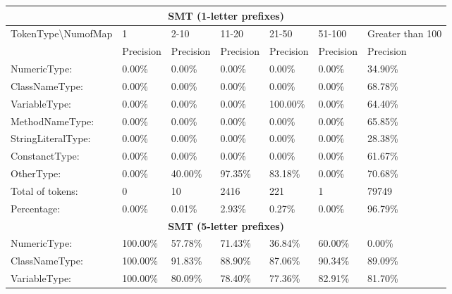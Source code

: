 \begin{table}[]
\tiny
\begin{tabular}{|l|l|l|l|l|l|l|}
\hline
\multicolumn{7}{|c|}{\textbf{SMT (1-letter prefixes)}}                                                           \\ \hline
TokenType\textbackslash{}NumofMap & 1         & 2-10      & 11-20     & 21-50     & 51-100    & Greater than 100 \\ \hline
                                  & Precision & Precision & Precision & Precision & Precision & Precision        \\ \hline
NumericType:                      & 0.00\%    & 0.00\%    & 0.00\%    & 0.00\%    & 0.00\%    & 34.90\%          \\ \hline
ClassNameType:                    & 0.00\%    & 0.00\%    & 0.00\%    & 0.00\%    & 0.00\%    & 68.78\%          \\ \hline
VariableType:                     & 0.00\%    & 0.00\%    & 0.00\%    & 100.00\%  & 0.00\%    & 64.40\%          \\ \hline
MethodNameType:                   & 0.00\%    & 0.00\%    & 0.00\%    & 0.00\%    & 0.00\%    & 65.85\%          \\ \hline
StringLiteralType:                & 0.00\%    & 0.00\%    & 0.00\%    & 0.00\%    & 0.00\%    & 28.38\%          \\ \hline
ConstanctType:                    & 0.00\%    & 0.00\%    & 0.00\%    & 0.00\%    & 0.00\%    & 61.67\%          \\ \hline
OtherType:                        & 0.00\%    & 40.00\%   & 97.35\%   & 83.18\%   & 0.00\%    & 70.68\%          \\ \hline
Total of tokens:                  & 0         & 10        & 2416      & 221       & 1         & 79749            \\ \hline
Percentage:                       & 0.00\%    & 0.01\%    & 2.93\%    & 0.27\%    & 0.00\%    & 96.79\%          \\ \hline
\multicolumn{7}{|c|}{\textbf{SMT (5-letter prefixes)}}                                                           \\ \hline
NumericType:                      & 100.00\%  & 57.78\%   & 71.43\%   & 36.84\%   & 60.00\%   & 0.00\%           \\ \hline
ClassNameType:                    & 100.00\%  & 91.83\%   & 88.90\%   & 87.06\%   & 90.34\%   & 89.09\%          \\ \hline
VariableType:                     & 100.00\%  & 80.09\%   & 78.40\%   & 77.36\%   & 82.91\%   & 81.70\%          \\ \hline

\end{tabular}
\end{table}
